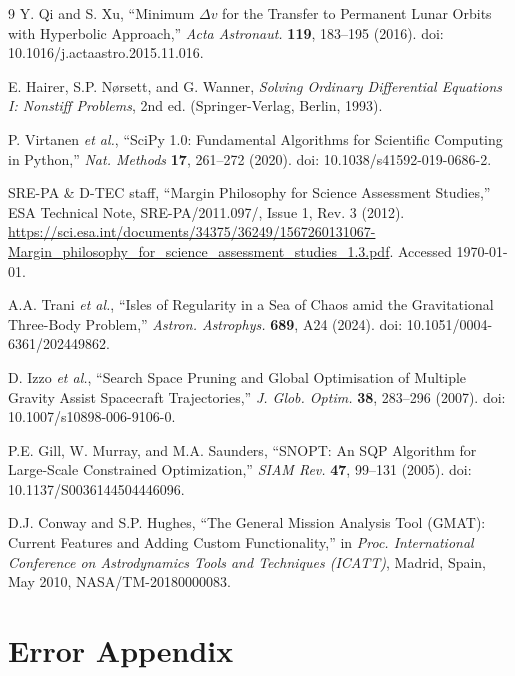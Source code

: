 \documentclass[10pt,twocolumn]{revtex4-2}    %
\begin{document}
\begin{thebibliography}{9}
Y. Qi and S. Xu, ``Minimum $\Delta v$ for the Transfer to Permanent Lunar Orbits
with Hyperbolic Approach,''
\textit{Acta Astronaut.} \textbf{119}, 183--195 (2016).
doi: 10.1016/j.actaastro.2015.11.016.

E. Hairer, S.P. N{\o}rsett, and G. Wanner,
\textit{Solving Ordinary Differential Equations I: Nonstiff Problems}, 2nd ed.
(Springer-Verlag, Berlin, 1993).

P. Virtanen \textit{et al.}, ``SciPy 1.0: Fundamental Algorithms for Scientific
Computing in Python,''
\textit{Nat. Methods} \textbf{17}, 261--272 (2020).
doi: 10.1038/s41592-019-0686-2.

SRE-PA \& D-TEC staff, ``Margin Philosophy for Science Assessment Studies,''
ESA Technical Note, SRE-PA/2011.097/, Issue 1, Rev. 3 (2012).
\url{https://sci.esa.int/documents/34375/36249/1567260131067-Margin\_philosophy\_for\_science\_assessment\_studies\_1.3.pdf}.
Accessed \today.

A.A. Trani \textit{et al.}, ``Isles of Regularity in a Sea of Chaos amid the
Gravitational Three-Body Problem,''
\textit{Astron. Astrophys.} \textbf{689}, A24 (2024).
doi: 10.1051/0004-6361/202449862.

D. Izzo \textit{et al.}, ``Search Space Pruning and Global Optimisation of Multiple
Gravity Assist Spacecraft Trajectories,''
\textit{J. Glob. Optim.} \textbf{38}, 283--296 (2007).
doi: 10.1007/s10898-006-9106-0.

P.E. Gill, W. Murray, and M.A. Saunders, ``SNOPT: An SQP Algorithm for
Large-Scale Constrained Optimization,''
\textit{SIAM Rev.} \textbf{47}, 99--131 (2005).
doi: 10.1137/S0036144504446096.

D.J. Conway and S.P. Hughes, ``The General Mission Analysis Tool ({GMAT}):
Current Features and Adding Custom Functionality,''
in \textit{Proc. International Conference on Astrodynamics Tools and Techniques (ICATT)},
Madrid, Spain, May 2010, NASA/TM-20180000083.

\end{thebibliography}

\newpage

\clearpage

\section*{Error Appendix}
\end{document}
